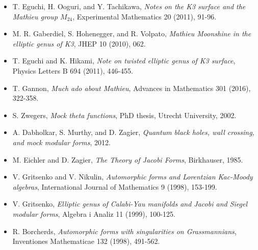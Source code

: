 \documentclass[11pt]{article}
\theoremstyle{definition}
\theoremstyle{remark}
\begin{document}
\begin{itemize}
\item T. Eguchi, H. Ooguri, and Y. Tachikawa, \emph{Notes on the K3
surface and the Mathieu group \(M_{24}\)}, Experimental Mathematics
20 (2011), 91-96.
\item M. R. Gaberdiel, S. Hohenegger, and R. Volpato, \emph{Mathieu
Moonshine in the elliptic genus of K3}, JHEP 10 (2010), 062.
\item T. Eguchi and K. Hikami, \emph{Note on twisted elliptic genus of
K3 surface}, Physics Letters B 694 (2011), 446-455.
\item T. Gannon, \emph{Much ado about Mathieu}, Advances in Mathematics
301 (2016), 322-358.
\item S. Zwegers, \emph{Mock theta functions}, PhD thesis, Utrecht
University, 2002.
\item A. Dabholkar, S. Murthy, and D. Zagier, \emph{Quantum black
holes, wall crossing, and mock modular forms}, 2012.
\item M. Eichler and D. Zagier, \emph{The Theory of Jacobi Forms},
Birkhauser, 1985.
\item V. Gritsenko and V. Nikulin, \emph{Automorphic forms and
Lorentzian Kac-Moody algebras}, International Journal of Mathematics
9 (1998), 153-199.
\item V. Gritsenko, \emph{Elliptic genus of Calabi-Yau manifolds and
Jacobi and Siegel modular forms}, Algebra i Analiz 11 (1999), 100-125.
\item R. Borcherds, \emph{Automorphic forms with singularities on
Grassmannians}, Inventiones Mathematicae 132 (1998), 491-562.
\end{itemize}
\end{document}
